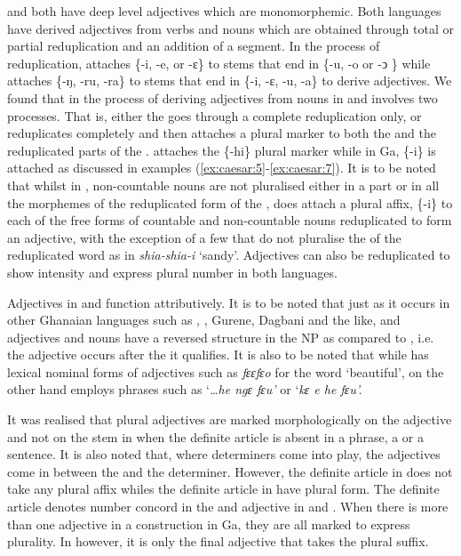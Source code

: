 \documentclass[output=paper,
modfonts
]{langscibook}
\begin{document}
 and  both have deep level adjectives which are monomorphemic. Both languages have derived adjectives from verbs and nouns which are obtained through total or partial reduplication and an addition of a segment. In the process of reduplication,  attaches \{-i, -e, or -ɛ\} to  stems that end in \{-u, -o or -ↄ
\} while  attaches \{-ŋ, -ru, -ra\} to  stems that end in \{-i, -ɛ, -u, -a\} to derive adjectives. We found that in the process of deriving adjectives from nouns in  and  involves two processes. That is, either the   goes through a complete reduplication only, or reduplicates completely and then attaches a plural marker to both the   and the reduplicated parts of the .  attaches the \{-hi\} plural marker while in Ga, \{-i\} is attached as discussed in examples (\ref{ex:caesar:5}-\ref{ex:caesar:7}). It is to be noted that whilst in , non-countable nouns are not pluralised either in a part or in all the morphemes of the reduplicated form of the ,  does attach a plural affix, \{-i\} to each of the free forms of countable and non-countable nouns reduplicated to form an adjective, with the exception of a few that do not pluralise the   of the reduplicated word as in \textit{shia-shia-i} ‘sandy’. Adjectives can also be reduplicated to show intensity and express plural number in both languages.



Adjectives in  and  function attributively. It is to be noted that just as it occurs in other Ghanaian languages such as , , Gurene, Dagbani and the like,  and  adjectives and nouns have a reversed structure in the NP as compared to , i.e. the adjective occurs after the  it qualifies. It is also to be noted that while  has lexical nominal forms of adjectives such as \textit{fɛɛfɛo} for the  word ‘beautiful’,  on the other hand employs phrases such as ‘\textit{…he ngɛ fɛu’} or ‘\textit{kɛ e he fɛu’.}


\newpage
It was realised that plural adjectives are marked morphologically on the adjective and not on the  stem in  when the definite article is absent in a phrase, a  or a sentence. It is also noted that, where determiners come into play, the adjectives come in between the  and the determiner. However, the definite article in  does not take any plural affix whiles the definite article in  have plural form. The definite article denotes number concord in the  and adjective in  and . When there is more than one adjective in a construction in Ga, they are all marked to express plurality. In  however, it is only the final adjective that takes the plural suffix.
\end{document}
